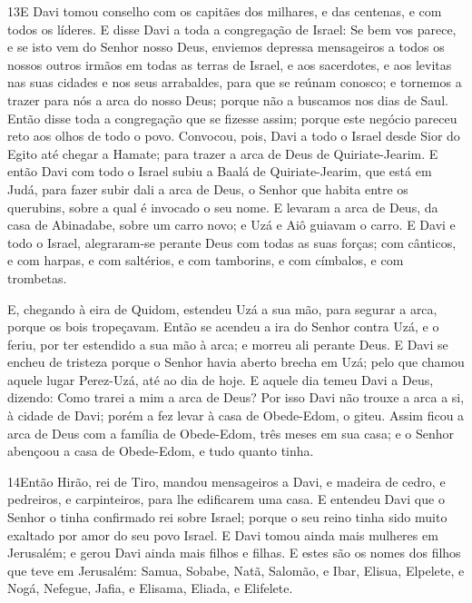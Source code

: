 \lettrine{13} E Davi tomou conselho com os capitães dos
milhares, e das centenas, e com todos os líderes. E disse Davi a
toda a congregação de Israel: Se bem vos parece, e se isto vem do
Senhor nosso Deus, enviemos depressa mensageiros a todos os nossos
outros irmãos em todas as terras de Israel, e aos sacerdotes, e aos
levitas nas suas cidades e nos seus arrabaldes, para que se reúnam
conosco; e tornemos a trazer para nós a arca do nosso Deus;
porque não a buscamos nos dias de Saul. Então disse toda a
congregação que se fizesse assim; porque este negócio pareceu reto
aos olhos de todo o povo. Convocou, pois, Davi a todo o Israel
desde Sior do Egito até chegar a Hamate; para trazer a arca de Deus
de Quiriate-Jearim. E então Davi com todo o Israel subiu a Baalá
de Quiriate-Jearim, que está em Judá, para fazer subir dali a arca
de Deus, o Senhor que habita entre os querubins, sobre a qual é
invocado o seu nome. E levaram a arca de Deus, da casa de
Abinadabe, sobre um carro novo; e Uzá e Aiô guiavam o carro. E
Davi e todo o Israel, alegraram-se perante Deus com todas as suas
forças; com cânticos, e com harpas, e com saltérios, e com
tamborins, e com címbalos, e com trombetas.

E, chegando à eira de Quidom, estendeu Uzá a sua mão, para segurar
a arca, porque os bois tropeçavam. Então se acendeu a ira do
Senhor contra Uzá, e o feriu, por ter estendido a sua mão à arca; e
morreu ali perante Deus. E Davi se encheu de tristeza porque
o Senhor havia aberto brecha em Uzá; pelo que chamou aquele lugar
Perez-Uzá, até ao dia de hoje. E aquele dia temeu Davi a
Deus, dizendo: Como trarei a mim a arca de Deus? Por isso
Davi não trouxe a arca a si, à cidade de Davi; porém a fez levar à
casa de Obede-Edom, o giteu. Assim ficou a arca de Deus com a
família de Obede-Edom, três meses em sua casa; e o Senhor abençoou a
casa de Obede-Edom, e tudo quanto tinha.

\medskip

\lettrine{14} Então Hirão, rei de Tiro, mandou mensageiros a
Davi, e madeira de cedro, e pedreiros, e carpinteiros, para lhe
edificarem uma casa. E entendeu Davi que o Senhor o tinha
confirmado rei sobre Israel; porque o seu reino tinha sido muito
exaltado por amor do seu povo Israel. E Davi tomou ainda mais
mulheres em Jerusalém; e gerou Davi ainda mais filhos e filhas.
E estes são os nomes dos filhos que teve em Jerusalém: Samua,
Sobabe, Natã, Salomão, e Ibar, Elisua, Elpelete, e Nogá,
Nefegue, Jafia, e Elisama, Eliada, e Elifelete.

